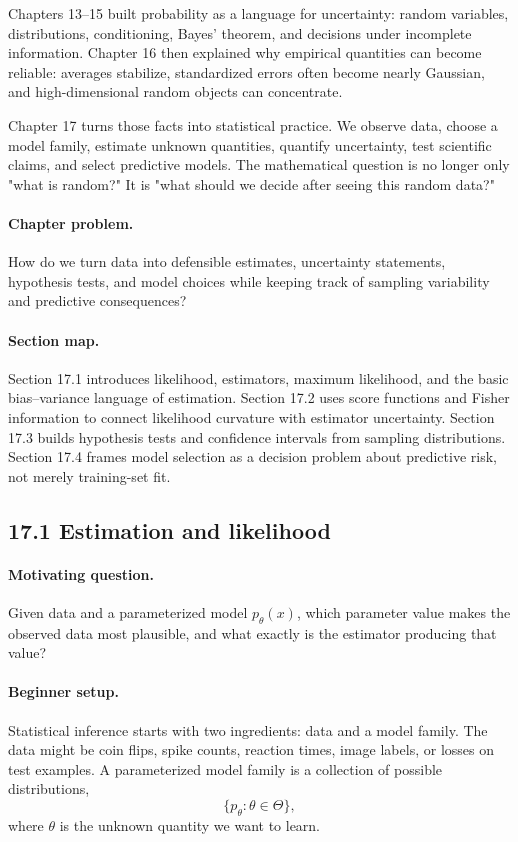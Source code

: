 Chapters 13--15 built probability as a language for uncertainty: random variables, distributions, conditioning, Bayes' theorem, and decisions under incomplete information. Chapter 16 then explained why empirical quantities can become reliable: averages stabilize, standardized errors often become nearly Gaussian, and high-dimensional random objects can concentrate.

Chapter 17 turns those facts into statistical practice. We observe data, choose a model family, estimate unknown quantities, quantify uncertainty, test scientific claims, and select predictive models. The mathematical question is no longer only "what is random?" It is "what should we decide after seeing this random data?"

\paragraph{Chapter problem.}
How do we turn data into defensible estimates, uncertainty statements, hypothesis tests, and model choices while keeping track of sampling variability and predictive consequences?

\paragraph{Section map.}
Section 17.1 introduces likelihood, estimators, maximum likelihood, and the basic bias--variance language of estimation. Section 17.2 uses score functions and Fisher information to connect likelihood curvature with estimator uncertainty. Section 17.3 builds hypothesis tests and confidence intervals from sampling distributions. Section 17.4 frames model selection as a decision problem about predictive risk, not merely training-set fit.

\subsection{17.1 Estimation and likelihood}

\paragraph{Motivating question.}
Given data and a parameterized model \(p_\theta(x)\), which parameter value makes the observed data most plausible, and what exactly is the estimator producing that value?

\paragraph{Beginner setup.}
Statistical inference starts with two ingredients: data and a model family. The data might be coin flips, spike counts, reaction times, image labels, or losses on test examples. A parameterized model family is a collection of possible distributions,
\[
\{p_\theta:\theta\in\Theta\},
\]
where \(\theta\) is the unknown quantity we want to learn.


